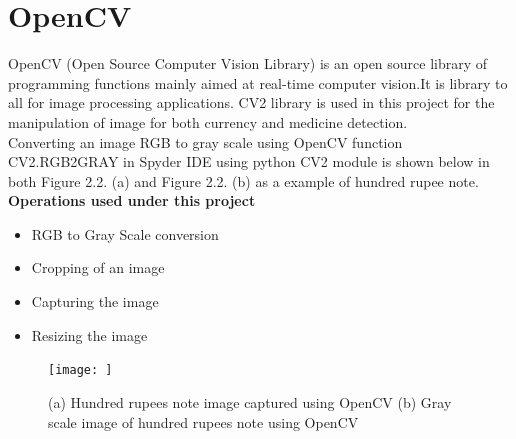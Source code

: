\section{OpenCV}
\noindent OpenCV (Open Source Computer Vision Library) is an open source library of programming functions mainly aimed at real-time computer vision.It is library to all for image processing applications. CV2 library is used in this project for the manipulation of image for both currency and medicine detection. \citeauthor{9020105}\\Converting an image RGB to gray scale using OpenCV function CV2.RGB2GRAY in Spyder IDE using python CV2 module is shown below in both Figure 2.2. (a) and Figure 2.2. (b) as a example of hundred rupee note.\\
\textbf{Operations used under this project}
\begin{itemize}
    \item RGB to Gray Scale conversion
    \item Cropping of an image
    \item Capturing the image
    \item Resizing the image
\end{itemize}
\begin{figure}[h!]
	\centering
	\texttt{[image: ]}
	\caption{(a) Hundred rupees note image captured using OpenCV (b) Gray scale image of hundred rupees note using OpenCV}
\end{figure}
